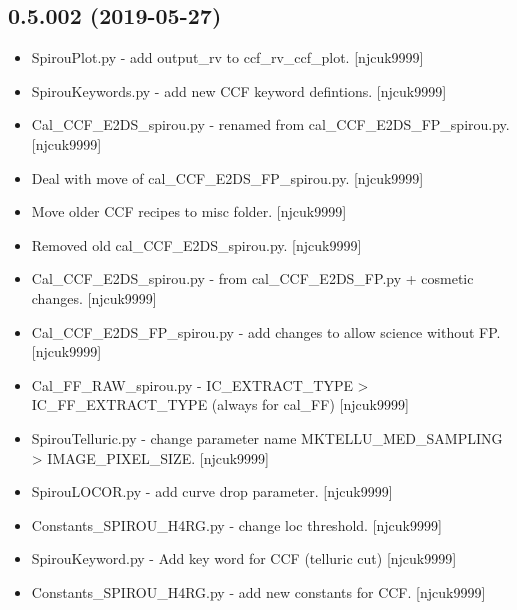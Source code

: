 \documentclass[a4paper,10pt,english]{report}
\begin{document}
\subsection{0.5.002 (2019-05-27)}
\label{\detokenize{misc/changelog:id133}}\begin{itemize}
\item {} 
SpirouPlot.py - add output\_rv to ccf\_rv\_ccf\_plot. {[}njcuk9999{]}

\item {} 
SpirouKeywords.py - add new CCF keyword defintions. {[}njcuk9999{]}

\item {} 
Cal\_CCF\_E2DS\_spirou.py - renamed from cal\_CCF\_E2DS\_FP\_spirou.py.
{[}njcuk9999{]}

\item {} 
Deal with move of cal\_CCF\_E2DS\_FP\_spirou.py. {[}njcuk9999{]}

\item {} 
Move older CCF recipes to misc folder. {[}njcuk9999{]}

\item {} 
Removed old cal\_CCF\_E2DS\_spirou.py. {[}njcuk9999{]}

\item {} 
Cal\_CCF\_E2DS\_spirou.py - from cal\_CCF\_E2DS\_FP.py + cosmetic changes.
{[}njcuk9999{]}

\item {} 
Cal\_CCF\_E2DS\_FP\_spirou.py - add changes to allow science without FP.
{[}njcuk9999{]}

\item {} 
Cal\_FF\_RAW\_spirou.py - IC\_EXTRACT\_TYPE \textendash{}\textgreater{} IC\_FF\_EXTRACT\_TYPE (always
for cal\_FF) {[}njcuk9999{]}

\item {} 
SpirouTelluric.py - change parameter name MKTELLU\_MED\_SAMPLING \textendash{}\textgreater{}
IMAGE\_PIXEL\_SIZE. {[}njcuk9999{]}

\item {} 
SpirouLOCOR.py - add curve drop parameter. {[}njcuk9999{]}

\item {} 
Constants\_SPIROU\_H4RG.py - change loc threshold. {[}njcuk9999{]}

\item {} 
SpirouKeyword.py - Add key word for CCF (telluric cut) {[}njcuk9999{]}

\item {} 
Constants\_SPIROU\_H4RG.py - add new constants for CCF. {[}njcuk9999{]}


\end{itemize}
\end{document}

